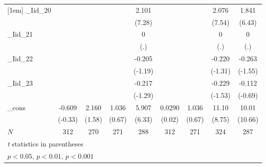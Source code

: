 {\begin{tabular}{l*{8}{c}}
[1em]
\_Iid\_20     &                     &                     &                     &       2.101\sym{***}&                     &                     &       2.076\sym{***}&       1.841\sym{***}\\
            &                     &                     &                     &      (7.28)         &                     &                     &      (7.54)         &      (6.43)         \\
[1em]
\_Iid\_21     &                     &                     &                     &           0         &                     &                     &           0         &           0         \\
            &                     &                     &                     &         (.)         &                     &                     &         (.)         &         (.)         \\
[1em]
\_Iid\_22     &                     &                     &                     &      -0.205         &                     &                     &      -0.220         &      -0.263         \\
            &                     &                     &                     &     (-1.19)         &                     &                     &     (-1.31)         &     (-1.55)         \\
[1em]
\_Iid\_23     &                     &                     &                     &      -0.217         &                     &                     &      -0.229         &      -0.112         \\
            &                     &                     &                     &     (-1.29)         &                     &                     &     (-1.53)         &     (-0.69)         \\
[1em]
\_cons      &      -0.609         &       2.160         &       1.036         &       5.907\sym{***}&      0.0290         &       1.036         &       11.10\sym{***}&       10.01\sym{***}\\
            &     (-0.33)         &      (1.58)         &      (0.67)         &      (6.33)         &      (0.02)         &      (0.67)         &      (8.75)         &     (10.66)         \\
\hline
\(N\)       &         312         &         270         &         271         &         288         &         312         &         271         &         324         &         287         \\
\hline\hline
\multicolumn{9}{l}{\footnotesize \textit{t} statistics in parentheses}\\
\multicolumn{9}{l}{\footnotesize \sym{*} \(p<0.05\), \sym{**} \(p<0.01\), \sym{***} \(p<0.001\)}\\
\end{tabular}
}
